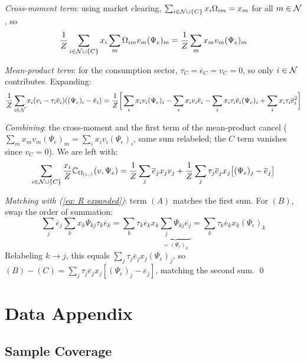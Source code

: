 \textit{Cross-moment term}: using market clearing, $\sum_{i \in \mathcal{N} \cup \{C\}} x_i \Omega_{im} = x_m$ for all $m \in \mathcal{N}$, so
$$\frac{1}{Z}\sum_{i \in \mathcal{N} \cup \{C\}} x_i \sum_{m} \Omega_{im}v_m(\Psi_e)_m = \frac{1}{Z}\sum_m x_m v_m (\Psi_e)_m$$

\textit{Mean-product term}: for the consumption sector, $\tau_C = \overline{e}_C = v_C = 0$, so only $i \in \mathcal{N}$ contributes. Expanding:
$$\frac{1}{Z}\sum_{i \in \mathcal{N}} x_i(v_i - \tau_i\overline{e}_i)((\Psi_e)_i - \overline{e}_i) = \frac{1}{Z}\bigg[\sum_i x_i v_i(\Psi_e)_i - \sum_i x_i v_i \overline{e}_i - \sum_i x_i\tau_i\overline{e}_i(\Psi_e)_i + \sum_i x_i\tau_i\overline{e}_i^2\bigg]$$

\textit{Combining}: the cross-moment and the first term of the mean-product cancel ($\sum_m x_m v_m(\Psi_e)_m = \sum_i x_i v_i(\Psi_e)_i$, same sum relabeled; the $C$ term vanishes since $v_C = 0$). We are left with:
$$\sum_{i \in \mathcal{N} \cup \{C\}} \frac{x_i}{Z}\mathbb{C}_{\Omega_{(i,:)}}(v, \Psi_e) = \frac{1}{Z}\sum_j \overline{e}_j x_j v_j + \frac{1}{Z}\sum_j \tau_j\overline{e}_j x_j\big[(\Psi_e)_j - \overline{e}_j\big]$$

\textit{Matching with (\ref{eq: R expanded})}: term $(A)$ matches the first sum. For $(B)$, swap the order of summation:
$$\sum_j \overline{e}_j \sum_k x_k\Psi_{kj}\tau_k\overline{e}_k = \sum_k \tau_k\overline{e}_k x_k \underbrace{\sum_j \Psi_{kj}\overline{e}_j}_{= (\Psi_e)_k} = \sum_k \tau_k\overline{e}_k x_k(\Psi_e)_k$$
Relabeling $k \to j$, this equals $\sum_j \tau_j\overline{e}_j x_j(\Psi_e)_j$, so $(B) - (C) = \sum_j \tau_j\overline{e}_j x_j[(\Psi_e)_j - \overline{e}_j]$, matching the second sum. \qed


\section{Data Appendix}\label{app:data}

\subsection{Sample Coverage}


